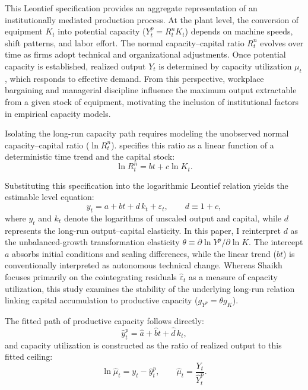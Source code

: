 This Leontief specification provides an aggregate representation of an institutionally mediated production process. At the plant level, the conversion of equipment $K_t$ into potential capacity ($Y^p_t = R^n_t K_t$) depends on machine speeds, shift patterns, and labor effort. The normal capacity--capital ratio $R^n_t$ evolves over time as firms adopt technical and organizational adjustments. Once potential capacity is established, realized output $Y_t$ is determined by capacity utilization $\mu_t$, which responds to effective demand. From this perspective, workplace bargaining and managerial discipline influence the maximum output extractable from a given stock of equipment, motivating the inclusion of institutional factors in empirical capacity models.

Isolating the long-run capacity path requires modeling the unobserved normal capacity--capital ratio ($\ln R^n_t$). \citet{Shaikh2016} specifies this ratio as a linear function of a deterministic time trend and the capital stock:
\begin{equation}
\ln R^n_t = bt + c \ln K_t.
\end{equation}

Substituting this specification into the logarithmic Leontief relation yields the estimable level equation:
\begin{equation}
y_t = a + bt + d\,k_t + \varepsilon_t,
\qquad d \equiv 1+c,
\end{equation}
where $y_t$ and $k_t$ denote the logarithms of unscaled output and capital, while $d$ represents the long-run output--capital elasticity. In this paper, I reinterpret $d$ as the unbalanced-growth transformation elasticity $\theta \equiv \partial \ln Y^p / \partial \ln K$. The intercept $a$ absorbs initial conditions and scaling differences, while the linear trend ($bt$) is conventionally interpreted as autonomous technical change. Whereas Shaikh focuses primarily on the cointegrating residuals $\hat{\varepsilon}_t$ as a measure of capacity utilization, this study examines the stability of the underlying long-run relation linking capital accumulation to productive capacity ($g_{Y^p} = \theta g_K$).

The fitted path of productive capacity follows directly:
\begin{equation}
\hat{y}^p_t = \hat{a} + \hat{b}t + \hat{d}\,k_t,
\end{equation}
and capacity utilization is constructed as the ratio of realized output to this fitted ceiling:
\begin{equation}
\ln \hat{\mu}_t = y_t - \hat{y}^p_t,
\qquad
\hat{\mu}_t = \frac{Y_t}{\hat{Y}^p_t}.
\end{equation}


